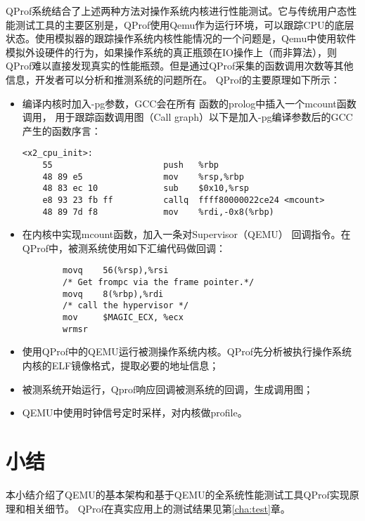 	QProf系统结合了上述两种方法对操作系统内核进行性能测试。它与传统用户态性能测试工具的主要区别是，QProf使用Qemu作为运行环境，可以跟踪CPU的底层状态。使用模拟器的跟踪操作系统内核性能情况的一个问题是，Qemu中使用软件模拟外设硬件的行为，如果操作系统的真正瓶颈在IO操作上（而非算法），则QProf难以直接发现真实的性能瓶颈。但是通过QProf采集的函数调用次数等其他信息，开发者可以分析和推测系统的问题所在。 QProf的主要原理如下所示：
	\begin{itemize}
		\item 编译内核时加入-pg参数，GCC会在所有
			函数的prolog中插入一个mcount函数调用，
			用于跟踪函数调用图（Call graph）以下是加入-pg编译参数后的GCC产生的函数序言：
\begin{lstlisting}[language={[x86masm]Assembler}]
<x2_cpu_init>:                                                 
	55                      push   %rbp                     
	48 89 e5                mov    %rsp,%rbp                
	48 83 ec 10             sub    $0x10,%rsp               
	e8 93 23 fb ff          callq  ffff80000022ce24 <mcount>
	48 89 7d f8             mov    %rdi,-0x8(%rbp)          
\end{lstlisting}

		\item 在内核中实现mcount函数，加入一条对Supervisor（QEMU）
			回调指令。在QProf中，被测系统使用如下汇编代码做回调：
\begin{Code}

\begin{lstlisting}
        movq    56(%rsp),%rsi
        /* Get frompc via the frame pointer.*/
        movq    8(%rbp),%rdi
        /* call the hypervisor */
        mov     $MAGIC_ECX, %ecx
        wrmsr
\end{lstlisting}
\end{Code}
		\item
		使用QProf中的QEMU运行被测操作系统内核。QProf先分析被执行操作系统内核的ELF镜像格式，提取必要的地址信息；
		\item 被测系统开始运行，Qprof响应回调被测系统的回调，生成调用图；
		\item QEMU中使用时钟信号定时采样，对内核做profile。
	\end{itemize}

\section{小结}

本小结介绍了QEMU的基本架构和基于QEMU的全系统性能测试工具QProf实现原理和相关细节。
QProf在真实应用上的测试结果见第\ref{cha:test}章。
